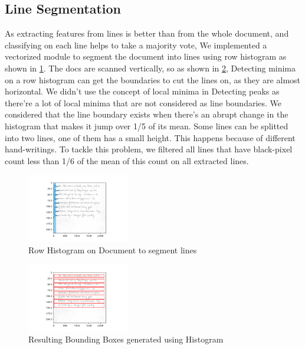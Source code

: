 \subsection{Line Segmentation}
As extracting features from lines is better than from the whole document, and classifying on each line helps to take a majority vote, We implemented a vectorized module to segment the document into lines using row histogram as shown in \ref{fig:histogram}. The docs are scanned vertically, so as shown in \ref{fig:bounding-boxes}, Detecting minima on a row histogram can get the boundaries to cut the lines on, as they are almost horizontal. We didn't use the concept of local minima in Detecting peaks as there're a lot of local minima that are not considered as line boundaries. We considered that the line boundary exists when there's an abrupt change in the histogram that makes it jump over 1/5 of its mean. Some lines can be splitted into two lines, one of them has a small height. This happens because of different hand-writings. To tackle this problem, we filtered all lines that have black-pixel count less than 1/6 of the mean of this count on all extracted lines. 

\begin{figure}[h!]
    \centering
    \includegraphics[width=0.4\textwidth]{images/histo.png}
    \caption{Row Histogram on Document to segment lines}
    \label{fig:histogram}
\end{figure}

\begin{figure}[h!]
    \centering
    \includegraphics[width=0.4\textwidth]{images/BB.png}
    \caption{Resulting Bounding Boxes generated using Histogram}
    \label{fig:bounding-boxes}
\end{figure}

